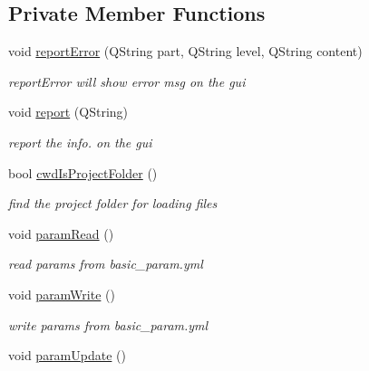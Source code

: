 \subsection*{Private Member Functions}
\begin{DoxyCompactItemize}
\item 
void \hyperlink{class_main_window_a3f28d61db0c30b00f7d6ee480522b03c}{report\+Error} (Q\+String part, Q\+String level, Q\+String content)
\begin{DoxyCompactList}\small\item\em report\+Error will show error msg on the gui \end{DoxyCompactList}\item 
\hypertarget{class_main_window_afa3e33327f098de80a36bb4fef886877}{}void \hyperlink{class_main_window_afa3e33327f098de80a36bb4fef886877}{report} (Q\+String)\label{class_main_window_afa3e33327f098de80a36bb4fef886877}

\begin{DoxyCompactList}\small\item\em report the info. on the gui \end{DoxyCompactList}\item 
\hypertarget{class_main_window_a44c01e2ff3bc7e4079333bf85b38d540}{}bool \hyperlink{class_main_window_a44c01e2ff3bc7e4079333bf85b38d540}{cwd\+Is\+Project\+Folder} ()\label{class_main_window_a44c01e2ff3bc7e4079333bf85b38d540}

\begin{DoxyCompactList}\small\item\em find the project folder for loading files \end{DoxyCompactList}\item 
\hypertarget{class_main_window_a3b45393cefaf7bdbf1755bdb1ac285b8}{}void \hyperlink{class_main_window_a3b45393cefaf7bdbf1755bdb1ac285b8}{param\+Read} ()\label{class_main_window_a3b45393cefaf7bdbf1755bdb1ac285b8}

\begin{DoxyCompactList}\small\item\em read params from basic\+\_\+param.\+yml \end{DoxyCompactList}\item 
\hypertarget{class_main_window_a554791dd2e36116f20e3d47939f965f7}{}void \hyperlink{class_main_window_a554791dd2e36116f20e3d47939f965f7}{param\+Write} ()\label{class_main_window_a554791dd2e36116f20e3d47939f965f7}

\begin{DoxyCompactList}\small\item\em write params from basic\+\_\+param.\+yml \end{DoxyCompactList}\item 
\hypertarget{class_main_window_a8f1c453150234c63a58fe764a87aa388}{}void \hyperlink{class_main_window_a8f1c453150234c63a58fe764a87aa388}{param\+Update} ()\label{class_main_window_a8f1c453150234c63a58fe764a87aa388}


\end{DoxyCompactItemize}
